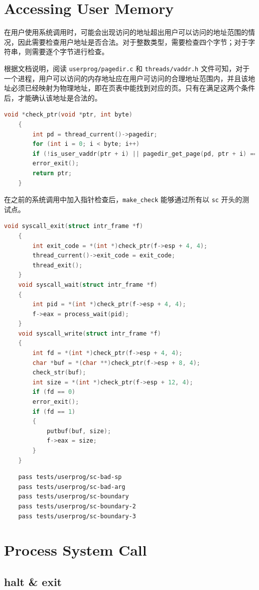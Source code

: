 \documentclass{article}
\begin{document}
\section{Accessing User Memory}

在用户使用系统调用时，可能会出现访问的地址超出用户可以访问的地址范围的情况，因此需要检查用户地址是否合法。对于整数类型，需要检查四个字节；对于字符串，则需要逐个字节进行检查。

根据文档说明，阅读 \texttt{userprog/pagedir.c} 和 \texttt{threads/vaddr.h} 文件可知，对于一个进程，用户可以访问的内存地址应在用户可访问的合理地址范围内，并且该地址必须已经映射为物理地址，即在页表中能找到对应的页。只有在满足这两个条件后，才能确认该地址是合法的。

\begin{lstlisting}[language=C]
	void *check_ptr(void *ptr, int byte)
	{
		int pd = thread_current()->pagedir;
		for (int i = 0; i < byte; i++)
		if (!is_user_vaddr(ptr + i) || pagedir_get_page(pd, ptr + i) == NULL)
		error_exit();
		return ptr;
	}
\end{lstlisting}

在之前的系统调用中加入指针检查后，\texttt{make\_check} 能够通过所有以 \texttt{sc} 开头的测试点。

\begin{lstlisting}[language=C]
	void syscall_exit(struct intr_frame *f)
	{
		int exit_code = *(int *)check_ptr(f->esp + 4, 4);
		thread_current()->exit_code = exit_code;
		thread_exit();
	}
	void syscall_wait(struct intr_frame *f)
	{
		int pid = *(int *)check_ptr(f->esp + 4, 4);
		f->eax = process_wait(pid);
	}
	void syscall_write(struct intr_frame *f)
	{
		int fd = *(int *)check_ptr(f->esp + 4, 4);
		char *buf = *(char **)check_ptr(f->esp + 8, 4);
		check_str(buf);
		int size = *(int *)check_ptr(f->esp + 12, 4);
		if (fd == 0)
		error_exit();
		if (fd == 1)
		{
			putbuf(buf, size);
			f->eax = size;
		}
	}
\end{lstlisting}

\begin{lstlisting}
	pass tests/userprog/sc-bad-sp
	pass tests/userprog/sc-bad-arg
	pass tests/userprog/sc-boundary
	pass tests/userprog/sc-boundary-2
	pass tests/userprog/sc-boundary-3
\end{lstlisting}

\section{Process System Call}

\subsection{halt \& exit}
\end{document}
